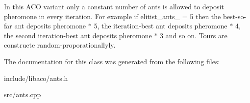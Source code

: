 In this ACO variant only a constant number of ants is allowed to deposit pheromone in every iteration. For example if elitist\_\-ants\_\- = 5 then the best-so-far ant deposits pheromone $\ast$ 5, the iteration-best ant deposits pheromone $\ast$ 4, the second iteration-best ant deposits pheromone $\ast$ 3 and so on. Tours are constructe random-proporationallyly. 

The documentation for this class was generated from the following files:\begin{CompactItemize}
\item 
include/libaco/ants.h\item 
src/ants.cpp\end{CompactItemize}
